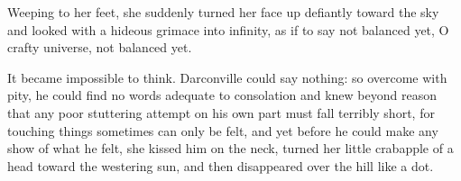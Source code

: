   Weeping to her feet, she suddenly turned her face up defiantly 
toward the sky and looked with a hideous grimace 
into infinity, as if to say not balanced yet, O crafty universe, not balanced 
yet.

  It became impossible to think. Darconville could say nothing: so overcome with
pity, he could find no words adequate to consolation and knew beyond reason that
any poor stuttering attempt on his own part must fall terribly short, for
touching things sometimes can only be felt, and yet before he could make any
show of what he felt, she kissed him on the neck, turned her little crabapple of
a head toward the westering 
sun, and then disappeared over the hill like a dot.
 
